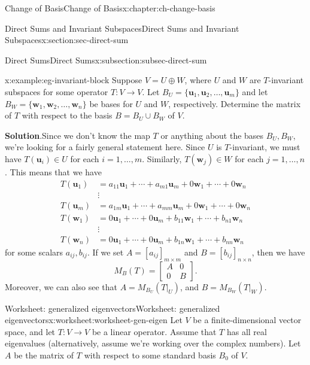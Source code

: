 \documentclass[oneside,10pt,]{book}
\newcommand{\blocktitlefont}{\relax}
\numberwithin{equation}{section}
\newcommand{\bbm}{\begin{bmatrix}}
\newcommand{\ebm}{\end{bmatrix}}
\newcommand{\uu}{\mathbf{u}}
\newcommand{\ww}{\mathbf{w}}
\newcommand{\basis}[2]{\{\mathbf{#1}_1,\mathbf{#1}_2,\ldots,\mathbf{#1}_{#2}\}}
\newcommand{\amp}{&}
\begin{document}
\begin{chapterptx}{Change of Basis}{}{Change of Basis}{}{}{x:chapter:ch-change-basis}
\begin{sectionptx}{Direct Sums and Invariant Subspaces}{}{Direct Sums and Invariant Subspaces}{}{}{x:section:sec-direct-sum}
\begin{subsectionptx}{Direct Sums}{}{Direct Sums}{}{}{x:subsection:subsec-direct-sum}
\begin{example}{}{x:example:eg-invariant-block}%
Suppose \(V=U\oplus W\), where \(U\) and \(W\) are \(T\)-invariant subspaces for some operator \(T:V\to V\). Let \(B_U=\basis{u}{m}\) and let \(B_W = \basis{w}{n}\) be bases for \(U\) and \(W\), respectively. Determine the matrix of \(T\) with respect to the basis \(B=B_U\cup B_W\) of \(V\).%
\par\smallskip%
\noindent\textbf{\blocktitlefont Solution}.\hypertarget{g:solution:idp135}{}\quad{}Since we don't know the map \(T\) or anything about the bases \(B_U,B_W\), we're looking for a fairly general statement here. Since \(U\) is \(T\)-invariant, we must have \(T(\uu_i)\in U\) for each \(i=1,\ldots, m\). Similarly, \(T(\ww_j)\in W\) for each \(j=1,\ldots, n\). This means that we have%
\begin{align*}
T(\uu_1) \amp = a_{11}\uu_1 + \cdots + a_{m1}\uu_m + 0\ww_1+\cdots + 0\ww_n\\
\amp \vdots \\
T(\uu_m) \amp = a_{1m}\uu_1 + \cdots + a_{mm}\uu_m+0\ww_1+\cdots + 0\ww_n\\
T(\ww_1) \amp = 0\uu_1 + \cdots + 0\uu_m+b_{11}\ww_1 + \cdots + b_{n1}\ww_n \\
\amp \vdots \\
T(\ww_n) \amp = 0\uu_1 + \cdots + 0\uu_m+b_{1n}\ww_1 + \cdots + b_{nn}\ww_n
\end{align*}
for some scalars \(a_{ij},b_{ij}\). If we set \(A = [a_{ij}]_{m\times m}\) and \(B = [b_{ij}]_{n\times n}\), then we have%
\begin{equation*}
M_B(T) = \bbm A \amp 0\\0\amp B\ebm\text{.}
\end{equation*}
Moreover, we can also see that \(A = M_{B_U}(T|_U)\), and \(B = M_{B_W}(T|_W)\).%
\end{example}
\end{subsectionptx}
\end{sectionptx}
%
%
\typeout{************************************************}
\typeout{************************************************}
%
\begin{worksheet-section}{Worksheet: generalized eigenvectors}{}{Worksheet: generalized eigenvectors}{}{}{x:worksheet:worksheet-gen-eigen}
Let \(V\) be a finite-dimensional vector space, and let \(T:V\to V\) be a linear operator. Assume that \(T\) has all real eigenvalues (alternatively, assume we're working over the complex numbers). Let \(A\) be the matrix of \(T\) with respect to some standard basis \(B_0\) of \(V\).%

\end{worksheet-section}
\end{chapterptx}
\end{document}
